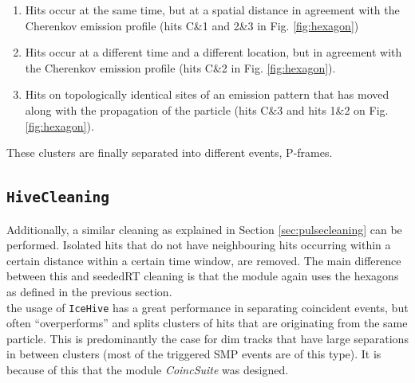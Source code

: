 \begin{enumerate}
\item Hits occur at the same time, but at a spatial distance in agreement with the Cherenkov emission profile (hits C\&1 and 2\&3 in Fig. \ref{fig:hexagon})
\item Hits occur at a different time and a different location, but in agreement with the Cherenkov emission profile (hits C\&2 in Fig. \ref{fig:hexagon}).
\item Hits on topologically identical sites of an emission pattern that has moved along with the propagation of the particle (hits C\&3 and hits 1\&2 on Fig. \ref{fig:hexagon}).
\end{enumerate}
These clusters are finally separated into different events, P-frames.

\subsection{\texttt{HiveCleaning}}
Additionally, a similar cleaning as explained in Section \ref{sec:pulsecleaning} can be performed. Isolated hits that do not have neighbouring hits occurring within a certain distance within a certain time window, are removed. The main difference between this and seededRT cleaning is that the module again uses the hexagons as defined in the previous section.\\

\noindent the usage of \texttt{IceHive} has a great performance in separating coincident events, but often ``overperforms'' and splits clusters of hits that are originating from the same particle. This is predominantly the case for dim tracks that have large separations in between clusters (most of the triggered SMP events are of this type). It is because of this that the module \textit{CoincSuite}  was designed.

